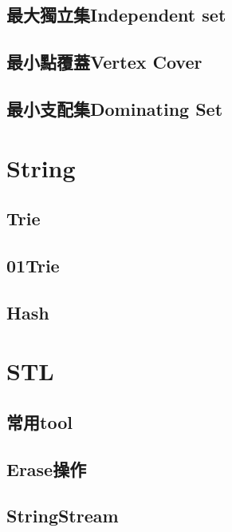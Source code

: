 \subsection{最大獨立集Independent set}


\subsection{最小點覆蓋Vertex Cover}


\subsection{最小支配集Dominating Set}


\section{String}

\subsection{Trie}


\subsection{01Trie}


\subsection{Hash}


\section{STL}

\subsection{常用tool}


\subsection{Erase操作}


\subsection{StringStream}


